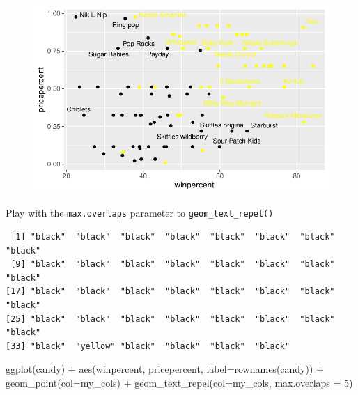 \documentclass[
  letterpaper,
  DIV=11,
  numbers=noendperiod]{scrartcl}
\newenvironment{Shaded}{\begin{snugshade}}{\end{snugshade}}
\newcommand{\AttributeTok}[1]{\textcolor[rgb]{0.40,0.45,0.13}{#1}}
\newcommand{\DecValTok}[1]{\textcolor[rgb]{0.68,0.00,0.00}{#1}}
\newcommand{\FunctionTok}[1]{\textcolor[rgb]{0.28,0.35,0.67}{#1}}
\newcommand{\NormalTok}[1]{\textcolor[rgb]{0.00,0.23,0.31}{#1}}
\newcommand{\SpecialCharTok}[1]{\textcolor[rgb]{0.37,0.37,0.37}{#1}}
\begin{document}
\begin{figure}[H]

{\centering \includegraphics{Class-9_files/figure-pdf/unnamed-chunk-23-1.pdf}

}

\end{figure}

Play with the \texttt{max.overlaps} parameter to
\texttt{geom\_text\_repel()}

\begin{Shaded}
\end{Shaded}

\begin{verbatim}
 [1] "black"  "black"  "black"  "black"  "black"  "black"  "black"  "black" 
 [9] "black"  "black"  "black"  "black"  "black"  "black"  "black"  "black" 
[17] "black"  "black"  "black"  "black"  "black"  "black"  "black"  "black" 
[25] "black"  "black"  "black"  "black"  "black"  "black"  "black"  "black" 
[33] "black"  "yellow" "black"  "black"  "black"  "black" 
\end{verbatim}

\begin{Shaded}
\begin{Highlighting}[]
\FunctionTok{ggplot}\NormalTok{(candy) }\SpecialCharTok{+}
  \FunctionTok{aes}\NormalTok{(winpercent, pricepercent, }\AttributeTok{label=}\FunctionTok{rownames}\NormalTok{(candy)) }\SpecialCharTok{+}
  \FunctionTok{geom\_point}\NormalTok{(}\AttributeTok{col=}\NormalTok{my\_cols) }\SpecialCharTok{+} 
  \FunctionTok{geom\_text\_repel}\NormalTok{(}\AttributeTok{col=}\NormalTok{my\_cols, }\AttributeTok{max.overlaps =} \DecValTok{5}\NormalTok{)}
\end{Highlighting}
\end{Shaded}
\end{document}
